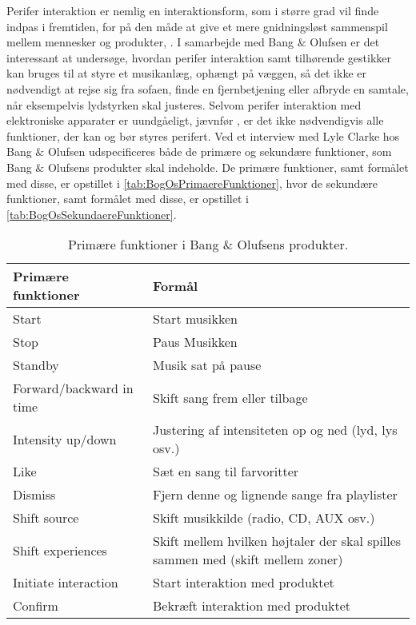 Perifer interaktion er nemlig en interaktionsform, som i større grad vil finde indpas i fremtiden, for på den måde at give et mere gnidningsløst sammenspil mellem mennesker og produkter, \parencite[s. 1]{PDF:PIIntroduction}. I samarbejde med Bang $\&$ Olufsen er det interessant at undersøge, hvordan perifer interaktion samt tilhørende gestikker kan bruges til at styre et musikanlæg, ophængt på væggen, så det ikke er nødvendigt at rejse sig fra sofaen, finde en fjernbetjening eller afbryde en samtale, når eksempelvis lydstyrken skal justeres. Selvom perifer interaktion med elektroniske apparater er uundgåeligt, jævnfør \textcite[s. 1]{PDF:PIIntroduction}, er det ikke nødvendigvis alle funktioner, der kan og bør styres perifert. Ved et interview med Lyle Clarke hos Bang $\&$ Olufsen udspecificeres både de primære og sekundære funktioner, som Bang $\&$ Olufsens produkter skal indeholde. De primære funktioner, samt formålet med disse, er opstillet i \autoref{tab:BogOsPrimaereFunktioner}, hvor de sekundære funktioner, samt formålet med disse, er opstillet i \autoref{tab:BogOsSekundaereFunktioner}.
%
\begin{table}[H]
	\centering
	\begin{tabular}{ | l | p{8cm} |}
		\hline
		\multicolumn{1}{|l|}{\textbf{Primære funktioner}} & \multicolumn{1}{l|}{\textbf{Formål}} \\ \hline
		Start & Start musikken \\ \hline
		Stop & Paus Musikken \\ \hline
		Standby & Musik sat på pause \\ \hline
		Forward/backward in time & Skift sang frem eller tilbage \\ \hline
		Intensity up/down & Justering af intensiteten op og ned (lyd, lys osv.) \\ \hline
		Like & Sæt en sang til farvoritter \\ \hline
		Dismiss & Fjern denne og lignende sange fra playlister \\ \hline
		Shift source & Skift musikkilde (radio, CD, AUX osv.) \\ \hline
		Shift experiences & Skift mellem hvilken højtaler der skal spilles sammen med (skift mellem zoner) \\ \hline
		Initiate interaction & Start interaktion med produktet \\ \hline
		Confirm & Bekræft interaktion med produktet \\ \hline
	\end{tabular}
	\caption{Primære funktioner i Bang $\&$ Olufsens produkter.}
	\label{tab:BogOsPrimaereFunktioner}
\end{table}
